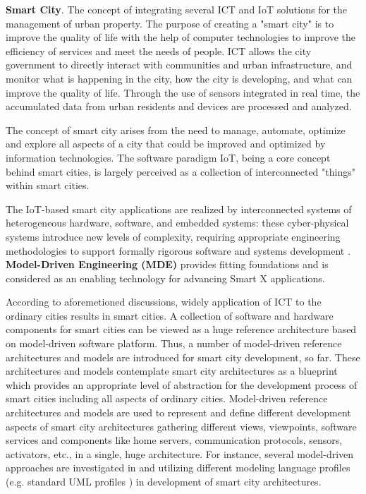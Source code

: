 \textbf{Smart City}. The concept of integrating several ICT and IoT solutions for the management of urban property. The purpose of creating a "smart city" is to improve the quality of life with the help of computer technologies to improve the efficiency of services and meet the needs of people. ICT allows the city government to directly interact with communities and urban infrastructure, and monitor what is happening in the city, how the city is developing, and what can improve the quality of life. Through the use of sensors integrated in real time, the accumulated data from urban residents and devices are processed and analyzed. 

The concept of smart city arises from the need to manage, automate, optimize and explore all aspects of a city that could be improved and optimized by information technologies. The software paradigm IoT, being a core concept behind smart cities, is largely perceived as a collection of interconnected "things" within smart cities.

The IoT-based smart city applications are realized by interconnected systems of heterogeneous hardware, software, and embedded systems: these cyber-physical systems introduce new levels of complexity, requiring appropriate engineering methodologies to support formally rigorous software and systems development \cite{Kuryazov+2018}. \textbf{Model-Driven Engineering (MDE)} provides fitting foundations and is considered as an enabling technology for advancing Smart X applications.

According to aforemetioned discussions, widely application of ICT to the ordinary cities results in smart cities. A collection of software and hardware components for smart cities can be viewed as a huge reference architecture based on model-driven software platform. Thus, a number of model-driven reference architectures \cite{KateuleWinter2018} and models \cite{Yin+2015} are introduced for smart city development, so far. These architectures and models contemplate smart city architectures as a blueprint which provides an appropriate level of abstraction for the development process of smart cities including all aspects of ordinary cities. Model-driven reference architectures and models are used to represent and define different development aspects of smart city architectures gathering different views, viewpoints, software services and components like home servers, communication protocols, sensors, activators, etc., in a single, huge architecture. For instance, several model-driven approaches are investigated in \cite{Corredor+2012} and \cite{KleanthisFoivos2016} utilizing different modeling language profiles (e.g. standard UML profiles \cite{Rumbaugh+2004}) in development of smart city architectures.

